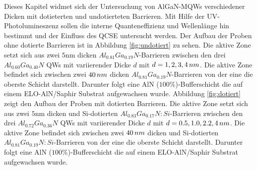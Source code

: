 % 
Dieses Kapitel widmet sich der Untersuchung von AlGaN-MQWs verschiedener Dicken mit dotieterten und undotierteten Barrieren. Mit Hilfe der UV-Photolumineszenz sollen die interne Quanteneffizienz und Wellenlänge hin bestimmt und der Einfluss des QCSE untersucht werden. 
Der Aufbau der Proben ohne dotierte Barrieren ist in Abbildung \ref{fig:undotiert} zu sehen.
Die aktive Zone setzt sich aus zwei $5$nm dicken $ Al_{0.81}Ga_{0.19}N$-Barrieren zwischen den drei $ Al_{0.60}Ga_{0.40}N$ QWs mit variierender Dicke $d$ mit $d=1,2,3,4 \thinspace nm$. Die aktive Zone befindet sich zwischen zwei $40 \thinspace nm$ dicken $ Al_{0.81}Ga_{0.19}N$-Barrieren von der eine die oberste Schicht darstellt. Darunter folgt eine AlN ($100\%$)-Bufferschicht die auf einem ELO-AlN/Saphir Substrat aufgewachsen wurde. 
Abbildung \ref{fig:dotiert} zeigt den Aufbau der Proben mit dotierten Barrieren. Die aktive Zone setzt sich aus zwei $5$nm dicken und Si-dotierten $ Al_{0.83}Ga_{0.17}N:Si$-Barrieren zwischen den drei $ Al_{0.72}Ga_{0.36}N$ QWs mit variierender Dicke $d$ mit $d=0.5,1.0,2.2,4 \thinspace nm$. Die aktive Zone befindet sich zwischen zwei $40 \thinspace nm$ dicken und Si-dotierten $ Al_{0.81}Ga_{0.19}N:Si$-Barrieren von der eine die oberste Schicht darstellt. Darunter folgt eine AlN ($100\%$)-Bufferschicht die auf einem ELO-AlN/Saphir Substrat aufgewachsen wurde. 
%

